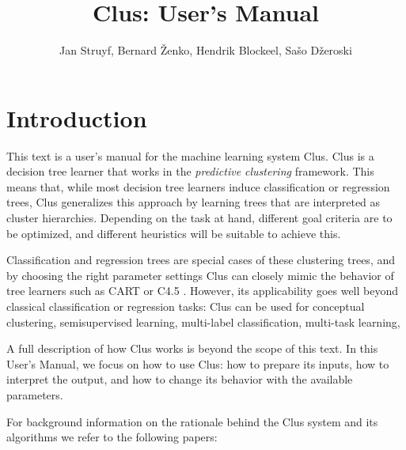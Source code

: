






\title{Clus: User's Manual}

\author{Jan Struyf, Bernard \v{Z}enko, Hendrik Blockeel, Sa\v{s}o D\v{z}eroski}

\maketitle



\tableofcontents



\chapter{Introduction}



This text is a user's manual for the machine learning system Clus.
Clus is a decision tree learner that works in the {\em predictive clustering} framework.
This means that, while most decision tree learners induce classification or regression trees,
Clus generalizes this approach by learning trees that are interpreted as cluster
hierarchies.  Depending on the task at hand, different goal criteria are to be optimized, and different heuristics will be suitable to achieve this.

Classification and regression trees are special cases of these clustering trees, and by choosing the right parameter settings Clus can closely mimic the behavior of tree learners such as CART \cite{Breiman84:other} or C4.5 \cite{Quinlan83:other}.  However, its applicability goes well beyond classical classification or regression tasks: Clus can be used for conceptual clustering, semisupervised learning, multi-label classification, multi-task learning, 

A full description of how Clus works is beyond the scope of this text.  In this User's Manual, we focus on how to use Clus: how to prepare its inputs, how to interpret the output, and how to change its behavior with the available parameters.

For background information on the rationale behind the Clus system and its algorithms we refer to the following papers:

